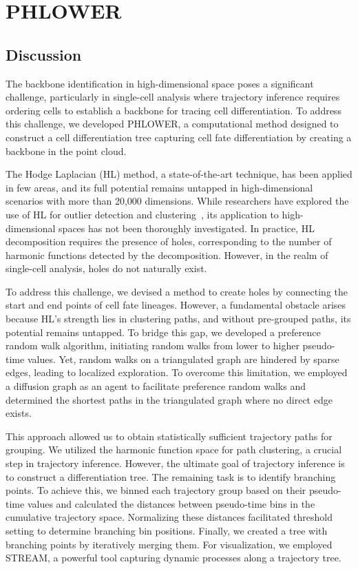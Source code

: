 \section{PHLOWER}
\subsection{Discussion}
The backbone identification in high-dimensional space poses a significant challenge, particularly in single-cell analysis where trajectory inference requires ordering cells to establish a backbone for tracing cell differentiation. To address this challenge, we developed PHLOWER, a computational method designed to construct a cell differentiation tree capturing cell fate differentiation by creating a backbone in the point cloud.

The Hodge Laplacian (HL) method, a state-of-the-art technique, has been applied in few areas, and its full potential remains untapped in high-dimensional scenarios with more than 20,000 dimensions. While researchers have explored the use of HL for outlier detection and clustering~\citep{frantzen2021outlier}, its application to high-dimensional spaces has not been thoroughly investigated. In practice, HL decomposition requires the presence of holes, corresponding to the number of harmonic functions detected by the decomposition. However, in the realm of single-cell analysis, holes do not naturally exist.

To address this challenge, we devised a method to create holes by connecting the start and end points of cell fate lineages. However, a fundamental obstacle arises because HL's strength lies in clustering paths, and without pre-grouped paths, its potential remains untapped. To bridge this gap, we developed a preference random walk algorithm, initiating random walks from lower to higher pseudo-time values. Yet, random walks on a triangulated graph are hindered by sparse edges, leading to localized exploration. To overcome this limitation, we employed a diffusion graph as an agent to facilitate preference random walks and determined the shortest paths in the triangulated graph where no direct edge exists.

This approach allowed us to obtain statistically sufficient trajectory paths for grouping. We utilized the harmonic function space for path clustering, a crucial step in trajectory inference. However, the ultimate goal of trajectory inference is to construct a differentiation tree. The remaining task is to identify branching points. To achieve this, we binned each trajectory group based on their pseudo-time values and calculated the distances between pseudo-time bins in the cumulative trajectory space. Normalizing these distances facilitated threshold setting to determine branching bin positions. Finally, we created a tree with branching points by iteratively merging them. For visualization, we employed STREAM, a powerful tool capturing dynamic processes along a trajectory tree.


